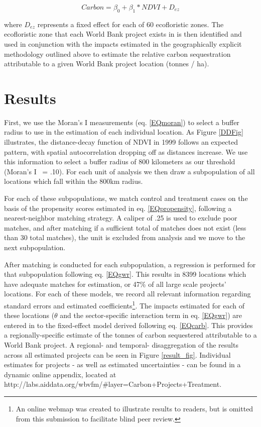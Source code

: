 \documentclass[sustainability,article,submit,moreauthors,pdftex,10pt,a4paper]{mdpi}
\begin{document}
\begin{equation}
Carbon = \beta_{0} + \beta_{1} * NDVI + D_{ez}
\label{EQcarb}
\end{equation}

where \begin{math}D_{ez}\end{math} represents a fixed effect for each of 60 ecofloristic zones. The ecofloristic zone that each World Bank project exists in is then identified and used in conjunction with the impacts estimated in the geographically explicit methodology outlined above to estimate the relative carbon sequestration attributable to a given World Bank project location (tonnes / ha).

\section{Results}
First, we use the Moran's I measurements (eq. \ref{EQmoran}) to select a buffer radius to use in the estimation of each individual location. As Figure \ref{DDFig} illustrates, the distance-decay function of NDVI in 1999 follows an expected pattern, with spatial autocorrelation dropping off as distances increase. We use this information to select a buffer radius of 800 kilometers as our threshold (Moran's I ~= .10). For each unit of analysis we then draw a subpopulation of all locations which fall within the 800km radius.
\par
For each of these subpopulations, we match control and treatment cases on the basis of the propensity scores estimated in eq. \ref{EQpropensity}, following a nearest-neighbor matching strategy. A caliper of .25 is used to exclude poor matches, and after matching if a sufficient total of matches does not exist (less than 30 total matches), the unit is excluded from analysis and we move to the next subpopulation. 
\par
 After matching is conducted for each subpopulation, a regression is performed for that subpopulation following eq. \ref{EQgwr}. This results in 8399 locations which have adequate matches for estimation, or 47\% of all large scale projects' locations. For each of these models, we record all relevant information regarding standard errors and estimated coefficients\footnote{An online webmap was created to illustrate results to readers, but is omitted from this submission to facilitate blind peer review.}. The impacts estimated for each of these locations (\begin{math}\theta\end{math} and the sector-specific interaction term in eq. \ref{EQgwr}) are entered in to the fixed-effect model derived following eq. \ref{EQcarb}. This provides a regionally-specific estimate of the tonnes of carbon sequestered attributable to a World Bank project. A regional- and temporal- disaggregation of the results across all estimated projects can be seen in Figure \ref{result_fig}. Individual estimates for projects - as well as estimated uncertainties - can be found in a dynamic online appendix, located at http://labs.aiddata.org/wbvfm/\#layer=Carbon+Projects+Treatment.
 
\end{document}
